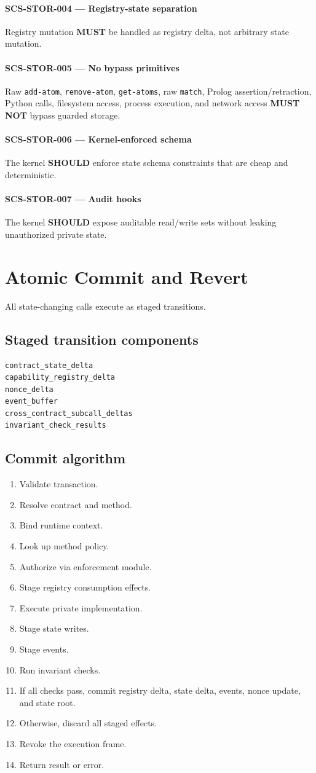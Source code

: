 \documentclass[11pt]{article}
\newcommand{\MUST}{\textbf{MUST}}
\newcommand{\MUSTNOT}{\textbf{MUST NOT}}
\newcommand{\SHOULD}{\textbf{SHOULD}}
\newcommand{\req}[2]{\paragraph{#1}#2\par}
\newcommand{\code}[1]{\texttt{#1}}
\begin{document}
\req{SCS-STOR-004 --- Registry-state separation}{Registry mutation \MUST{} be handled as registry delta, not arbitrary state mutation.}

\req{SCS-STOR-005 --- No bypass primitives}{Raw \code{add-atom}, \code{remove-atom}, \code{get-atoms}, raw \code{match}, Prolog assertion/retraction, Python calls, filesystem access, process execution, and network access \MUSTNOT{} bypass guarded storage.}

\req{SCS-STOR-006 --- Kernel-enforced schema}{The kernel \SHOULD{} enforce state schema constraints that are cheap and deterministic.}

\req{SCS-STOR-007 --- Audit hooks}{The kernel \SHOULD{} expose auditable read/write sets without leaking unauthorized private state.}



\section{Atomic Commit and Revert}

All state-changing calls execute as staged transitions.

\subsection{Staged transition components}

\begin{lstlisting}
contract_state_delta
capability_registry_delta
nonce_delta
event_buffer
cross_contract_subcall_deltas
invariant_check_results
\end{lstlisting}

\subsection{Commit algorithm}

\begin{enumerate}
  \item Validate transaction.
  \item Resolve contract and method.
  \item Bind runtime context.
  \item Look up method policy.
  \item Authorize via enforcement module.
  \item Stage registry consumption effects.
  \item Execute private implementation.
  \item Stage state writes.
  \item Stage events.
  \item Run invariant checks.
  \item If all checks pass, commit registry delta, state delta, events, nonce update, and state root.
  \item Otherwise, discard all staged effects.
  \item Revoke the execution frame.
  \item Return result or error.
\end{enumerate}
\end{document}
